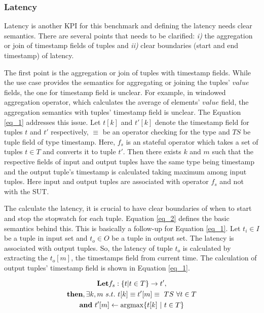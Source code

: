 \documentclass{vldb}
\begin{document}
\subsubsection{Latency}
\label{sec_latency}
Latency is another KPI for this benchmark and defining the latency needs clear semantics. There are several points that needs to be clarified: \textit{i)} the aggregation or join of timestamp fields of tuples and \textit{ii)} clear boundaries (start and end timestamp) of latency.

The first point is the aggregation or join of tuples with timestamp fields. While the use case provides the semantics for aggregating or joining the tuples' $value$ fields, the one for timestamp field is unclear. For example, in windowed aggregation operator, which calculates the average of elements' $value$ field, the aggregation semantics with tuples' timestamp field is unclear.  The Equation \ref{eq_1} addresses this issue. Let $t[k]$ and $t'[k]$ denote the timestamp field for tuples $t$ and $t'$ respectively,  $\equiv$ be an operator checking for the type and $TS$ be tuple field of type timestamp. Here, $f_{s}$ is an stateful operator which takes a set of tuples $t \in T$ and converts it to tuple $t'$. Then there exists $k$ and $m$ such that the respective fields of input and output tuples have the same type being timestamp and the output tuple's timestamp is calculated taking maximum among input tuples. Here input and output tuples are associated with operator $f_{s}$ and not with the SUT.

The calculate the latency, it is crucial to have clear boundaries of when to start and stop the stopwatch for each tuple. Equation \ref{eq_2} defines the basic semantics behind this. This is basically a follow-up for Equation \ref{eq_1}. Let $t_{i} \in I$ be a tuple in input set and $t_{o} \in O$ be a tuple in output set. The latency is associated with output tuples. So, the latency of tuple $t_{o}$ is calculated by extracting the $t_{o}[m]$, the timestamps field from current time. The calculation of output tuples' timestamp field is shown in Equation \ref{eq_1}. 


\begin{equation}
  \begin{gathered}
\textbf{Let} f_{s}:\{t| t\in T \} \to t'  , \\
  \textbf{then}, \exists k,m \ s.t. \ t[k]  \equiv t'[m] \equiv \ TS \ \forall t \in T\\
  \textbf{and} \ t'[m] \gets \argmax\{t[k] \ | \ t \in T\}  
    \end{gathered}
      \label{eq_1} 
  \end{equation}
\end{document}
